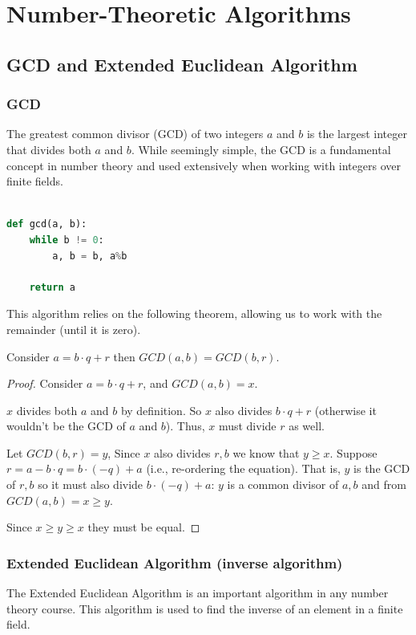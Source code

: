 \chapter{Number-Theoretic Algorithms}
\section{GCD and Extended Euclidean Algorithm}

\subsection{GCD}
The greatest common divisor (GCD) of two integers
$a$ and $b$ is the largest integer that divides both $a$ and $b$.
While seemingly simple, the GCD is a fundamental concept in number theory
and used extensively when working with integers over finite fields.


\begin{lstlisting}[language=Python,
  caption={GCD algorithm in python}
]

def gcd(a, b):
    while b != 0:
        a, b = b, a%b

    return a
 \end{lstlisting}

This algorithm relies on the following theorem, allowing us to work with the remainder (until it is zero).
\begin{theorem}
  Consider $a=b\cdot q +r$ then $GCD(a,b)= GCD(b,r)$.
\end{theorem}

\begin{proof}
  Consider $a=b\cdot q +r$, and $GCD(a,b)=x$.

  $x$ divides both $a$ and $b$ by definition. So $x$ also divides 
  $b\cdot q+ r$ (otherwise it wouldn't be the GCD of $a$ and $b$).
  Thus, $x$ must divide $r$ as well. 

  Let $GCD(b,r)=y$, Since $x$ also divides $r,b$ we know that $y\ge x$.
  Suppose $r=a-b\cdot q=b\cdot(-q) +a$ (i.e., re-ordering the equation). 
  That is, $y$ is the GCD of $r,b$ so it must also divide $b\cdot(-q) +a$: 
  $y$ is a common divisor of $a,b$ and from $GCD(a,b)=x\ge y$.
  
  Since $x\ge y \ge x$ they must be equal.
\end{proof}


\subsection{Extended Euclidean Algorithm (inverse algorithm)}
\label{sec:finite-field:extended-euclidean}
The Extended Euclidean Algorithm is an important algorithm in any number theory course.
This algorithm is used to find the inverse of an element in a finite field.
